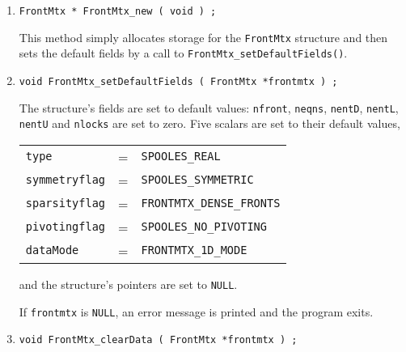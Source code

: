 \begin{enumerate}
\item
\begin{verbatim}
FrontMtx * FrontMtx_new ( void ) ;
\end{verbatim}
This method simply allocates storage for the {\tt FrontMtx} structure 
and then sets the default fields by a call to 
{\tt FrontMtx\_setDefaultFields()}.
\item
\begin{verbatim}
void FrontMtx_setDefaultFields ( FrontMtx *frontmtx ) ;
\end{verbatim}
The structure's fields are set to default values:
{\tt nfront}, {\tt neqns}, {\tt nentD}, {\tt nentL}, {\tt nentU}  and
{\tt nlocks} are set to zero.
Five scalars are set to their default values,
\begin{center}
\begin{tabular}{lcl}
{\tt type}         & = &  {\tt SPOOLES\_REAL} \\
{\tt symmetryflag} & = &  {\tt SPOOLES\_SYMMETRIC} \\
{\tt sparsityflag} & = &  {\tt FRONTMTX\_DENSE\_FRONTS} \\
{\tt pivotingflag} & = &  {\tt SPOOLES\_NO\_PIVOTING} \\
{\tt dataMode}     & = &  {\tt FRONTMTX\_1D\_MODE}
\end{tabular}
\end{center}
and the structure's pointers are set to {\tt NULL}.
\par {}
If {\tt frontmtx} is {\tt NULL},
an error message is printed and the program exits.
\item
\begin{verbatim}
void FrontMtx_clearData ( FrontMtx *frontmtx ) ;
\end{verbatim}

\end{enumerate}
